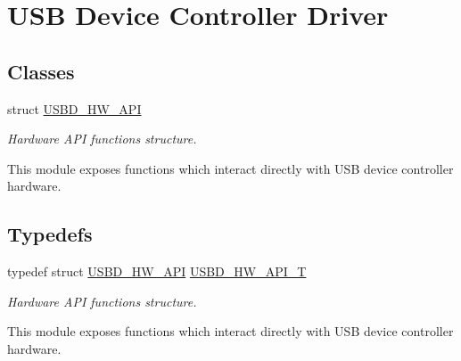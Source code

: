 \hypertarget{group___u_s_b_d___h_w}{}\section{U\+SB Device Controller Driver}
\label{group___u_s_b_d___h_w}
\subsection*{Classes}
\begin{DoxyCompactItemize}
\item 
struct \hyperlink{struct_u_s_b_d___h_w___a_p_i}{U\+S\+B\+D\+\_\+\+H\+W\+\_\+\+A\+PI}
\begin{DoxyCompactList}\small\item\em Hardware A\+PI functions structure.

This module exposes functions which interact directly with U\+SB device controller hardware. \end{DoxyCompactList}\end{DoxyCompactItemize}
\subsection*{Typedefs}
\begin{DoxyCompactItemize}
\item 
typedef struct \hyperlink{struct_u_s_b_d___h_w___a_p_i}{U\+S\+B\+D\+\_\+\+H\+W\+\_\+\+A\+PI} \hyperlink{group___u_s_b_d___h_w_ga4df5b7beaddc4e9267c320d92b4434fc}{U\+S\+B\+D\+\_\+\+H\+W\+\_\+\+A\+P\+I\+\_\+T}
\begin{DoxyCompactList}\small\item\em Hardware A\+PI functions structure.

This module exposes functions which interact directly with U\+SB device controller hardware. \end{DoxyCompactList}\end{DoxyCompactItemize}
